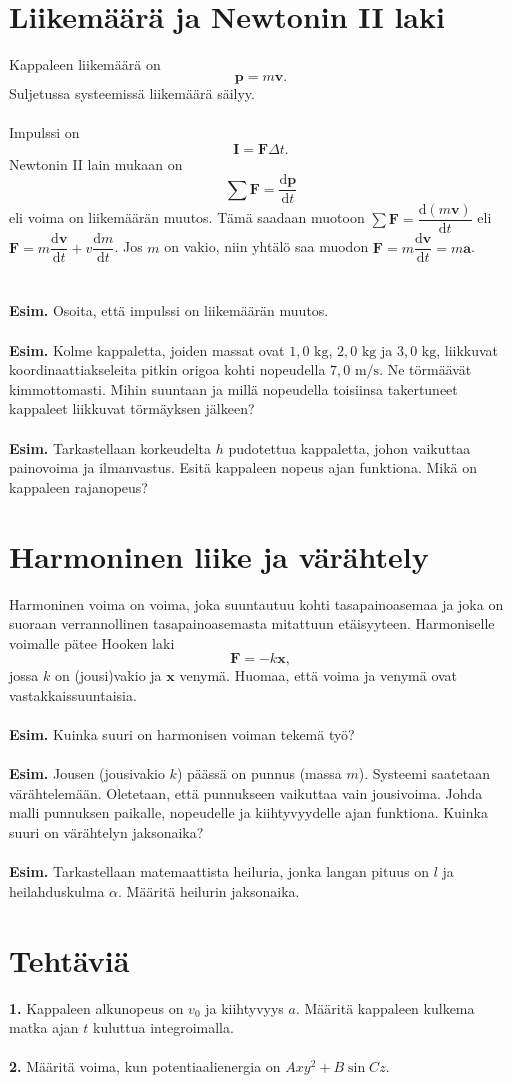 \documentclass{article}
\begin{document}
\section{Liikemäärä ja Newtonin II laki}
Kappaleen liikemäärä on $$\mathbf{p}=m\mathbf{v}.$$ Suljetussa systeemissä liikemäärä säilyy.\\
 \\
Impulssi on $$\mathbf{I}=\mathbf{F}\Delta t.$$ Newtonin II lain mukaan on $$\sum \mathbf{F}=\frac{\text{d}\mathbf{p}}{\text{d}t}$$ eli voima on liikemäärän muutos. Tämä saadaan muotoon \(\sum \mathbf{F}=\dfrac{\text{d}(m\mathbf{v})}{\text{d}t}\) eli \(\mathbf{F}=m\dfrac{\text{d}\mathbf{v}}{\text{d}t}+v\dfrac{\text{d}m}{\text{d}t}\). Jos \(m\) on vakio, niin yhtälö saa muodon \(\mathbf{F}=m\dfrac{\text{d}\mathbf{v}}{\text{d}t}=m\mathbf{a}\).
 \\
  \\
   \\
\textbf{Esim.} Osoita, että impulssi on liikemäärän muutos.\\
 \\
\textbf{Esim.} Kolme kappaletta, joiden massat ovat \(1,0\text{ kg}\), \(2,0\text{ kg}\) ja \(3,0\text{ kg}\), liikkuvat koordinaattiakseleita pitkin origoa kohti nopeudella \(7,0\text{ m/s}\). Ne törmäävät kimmottomasti. Mihin suuntaan ja millä nopeudella toisiinsa takertuneet kappaleet liikkuvat törmäyksen jälkeen?\\
 \\
\textbf{Esim.} Tarkastellaan korkeudelta \(h\) pudotettua kappaletta, johon vaikuttaa painovoima ja ilmanvastus. Esitä kappaleen nopeus ajan funktiona. Mikä on kappaleen rajanopeus?

\newpage
\section{Harmoninen liike ja värähtely}
Harmoninen voima on voima, joka suuntautuu kohti tasapainoasemaa ja joka on suoraan verrannollinen tasapainoasemasta mitattuun etäisyyteen. Harmoniselle voimalle pätee Hooken laki $$\mathbf{F}=-k\mathbf{x},$$ jossa \(k\) on (jousi)vakio ja \(\mathbf{x}\) venymä. Huomaa, että voima ja venymä ovat vastakkaissuuntaisia.\\
 \\
\textbf{Esim.} Kuinka suuri on harmonisen voiman tekemä työ?\\
 \\
\textbf{Esim.} Jousen (jousivakio \(k\)) päässä on punnus (massa \(m\)). Systeemi saatetaan värähtelemään. Oletetaan, että punnukseen vaikuttaa vain jousivoima. Johda malli punnuksen paikalle, nopeudelle ja kiihtyvyydelle ajan funktiona. Kuinka suuri on värähtelyn jaksonaika?\\
 \\
\textbf{Esim.} Tarkastellaan matemaattista heiluria, jonka langan pituus on \(l\) ja heilahduskulma \(\alpha\). Määritä heilurin jaksonaika.

\newpage
\section*{Tehtäviä}
\textbf{1.} Kappaleen alkunopeus on \(v_0\) ja kiihtyvyys \(a\). Määritä kappaleen kulkema matka ajan \(t\) kuluttua integroimalla.\\
 \\
\textbf{2.} Määritä voima, kun potentiaalienergia on \(Axy^2+B\sin Cz\).
\end{document}
